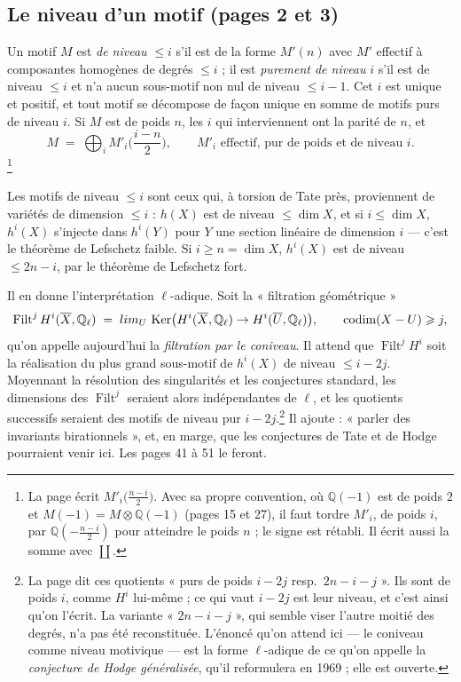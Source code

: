 \documentclass[11pt,a4paper]{article}
\begin{document}
\subsection*{Le niveau d'un motif (pages 2 et 3)}

Un motif $M$ est \emph{de niveau} $\leqslant i$ s'il est de la forme $M'(n)$ avec
$M'$ effectif à composantes homogènes de degrés $\leqslant i$ ; il est
\emph{purement de niveau} $i$ s'il est de niveau $\leqslant i$ et n'a aucun
sous-motif non nul de niveau $\leqslant i-1$. Cet $i$ est unique et positif,
et tout motif se décompose de façon unique en somme de motifs purs de niveau
$i$. Si $M$ est de poids $n$, les $i$ qui interviennent ont la parité de $n$,
et
\[
M \;=\; \bigoplus_{i} M'_{i}\Big(\frac{i-n}{2}\Big) ,
\qquad M'_{i} \text{ effectif, pur de poids et de niveau } i .
\]\footnote{La page écrit $M'_{i}\big(\frac{n-i}{2}\big)$. Avec sa propre
convention, où $\mathbb{Q}(-1)$ est de poids $2$ et $M(-1) = M \otimes
\mathbb{Q}(-1)$ (pages 15 et 27), il faut tordre $M'_{i}$, de poids $i$, par
$\mathbb{Q}(-\frac{n-i}{2})$ pour atteindre le poids $n$ ; le signe est
rétabli. Il écrit aussi la somme avec $\coprod$.}

Les motifs de niveau $\leqslant i$ sont ceux qui, à torsion de Tate près,
proviennent de variétés de dimension $\leqslant i$ : $h(X)$ est de niveau
$\leqslant \dim X$, et si $i \leqslant \dim X$, $h^{i}(X)$ s'injecte dans
$h^{i}(Y)$ pour $Y$ une section linéaire de dimension $i$ --- c'est le théorème
de Lefschetz faible. Si $i \geqslant n = \dim X$, $h^{i}(X)$ est de niveau
$\leqslant 2n-i$, par le théorème de Lefschetz fort.

Il en donne l'interprétation $\ell$-adique. Soit la « filtration géométrique »
\[
\operatorname{Filt}^{j} H^{i}(\overline{X}, \mathbb{Q}_{\ell})
\;=\; \varinjlim_{U}\, \operatorname{Ker}\bigl(H^{i}(\overline{X}, \mathbb{Q}_{\ell})
\to H^{i}(\overline{U}, \mathbb{Q}_{\ell})\bigr) ,
\qquad \operatorname{codim}(X - U) \geqslant j ,
\]
qu'on appelle aujourd'hui la \emph{filtration par le coniveau}. Il attend que
$\operatorname{Filt}^{j} H^{i}$ soit la réalisation du plus grand sous-motif de
$h^{i}(X)$ de niveau $\leqslant i - 2j$. Moyennant la résolution des
singularités et les conjectures standard, les dimensions des
$\operatorname{Filt}^{j}$ seraient alors indépendantes de $\ell$, et les
quotients successifs seraient des motifs de niveau pur $i-2j$.\footnote{La page
dit ces quotients « purs de poids $i-2j$ resp.\ $2n-i-j$ ». Ils sont de poids
$i$, comme $H^{i}$ lui-même ; ce qui vaut $i-2j$ est leur niveau, et c'est
ainsi qu'on l'écrit. La variante « $2n-i-j$ », qui semble viser l'autre moitié
des degrés, n'a pas été reconstituée. L'énoncé qu'on attend ici --- le
coniveau comme niveau motivique --- est la forme $\ell$-adique de ce qu'on
appelle la \emph{conjecture de Hodge généralisée}, qu'il reformulera en 1969 ;
elle est ouverte.} Il ajoute : « parler des invariants birationnels », et, en
marge, que les conjectures de Tate et de Hodge pourraient venir ici. Les pages
41 à 51 le feront.
\end{document}
